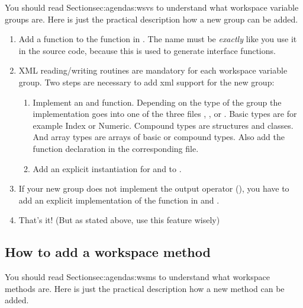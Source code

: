 You should read Section{sec:agendas:wsvs} to understand what workspace
variable groups are. Here is just the practical description how a new
group can be added.

\begin{enumerate}
\item Add a  function to
  the function  in .
  The name must be \emph{exactly} like you use it in the source code,
  because this is used to generate interface functions.
\item XML reading/writing routines are mandatory for each workspace variable
  group. Two steps are necessary to add xml support for the new group:
  \begin{enumerate}
  \item Implement an 
    and  function. Depending
    on the type of the group the implementation goes into one
    of the three files ,
    , or
    . Basic types are for example Index
    or Numeric. Compound types are structures and classes. And array types are
    arrays of basic or compound types. Also add the function declaration in the
    corresponding  file.
  \item Add an explicit instantiation for
     and
     to .
  \end{enumerate}
\item If your new group does not implement the output operator
  (), you have to add an explicit implementation
  of the  function in  and
  .
\item That's it! (But as stated above, use this feature wisely)
\end{enumerate}



\subsection{How to add a workspace method}

You should read Section{sec:agendas:wsms} to understand what workspace
methods are. Here is just the practical description how a new
method can be added.

